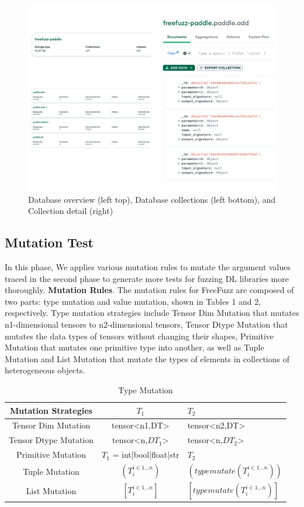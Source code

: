 \documentclass[sigconf]{acmart}
\begin{document}
   \begin{figure}[h]
    \centering
    \includegraphics[width=\linewidth]{3.png}
    \caption{Database overview (left top), Database collections (left bottom), and Collection detail (right)}
  \end{figure}
  
  \subsection{Mutation Test}

  In this phase, We applies various mutation rules to mutate
  the argument values traced in the second phase to generate more
  tests for fuzzing DL libraries more thoroughly.\cite{w1}
  \newline \textbf{Mutation Rules}. The mutation rules for FreeFuzz are composed
  of two parts: type mutation and value mutation, shown in Tables 1
  and 2, respectively. Type mutation strategies include Tensor Dim
  Mutation that mutates n1-dimensional tensors to n2-dimensional
  tensors, Tensor Dtype Mutation that mutates the data types of tensors without changing their shapes, Primitive Mutation that mutates
  one primitive type into another, as well as Tuple Mutation and List
  Mutation that mutate the types of elements in collections of heterogeneous objects.


  \begin{table}[h]
    \centering
    \caption{Type Mutation}
    \label{tab:freq}
    \begin{tabular}{ccl}
      \toprule
      Mutation Strategies&$T_1$&$T_2$\\
      \midrule
      Tensor Dim Mutation & tensor<n1,DT>& tensor<n2,DT>\\
      Tensor Dtype Mutation & tensor<n,$DT_1$>& tensor<n,$DT_2$>\\
      Primitive Mutation & $T_1$ = int|bool|float|str & $T_2$\\
      Tuple Mutation & $(T_i ^ {i\in 1...n})$&$(typemutate(T_i ^ {i\in 1...n}))$ \\
      List Mutation & $[T_i ^ {i\in 1...n}]$&$[typemutate(T_i ^ {i\in 1...n})]$ \\
    \bottomrule
  \end{tabular}
  \end{table}
\end{document}
